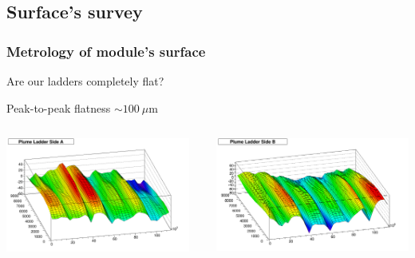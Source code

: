 \documentclass{beamer}
\begin{document}
  \subsection{Surface's survey}
  \begin{frame}
    \frametitle{Metrology of module's surface}

    \begin{block}{Are our ladders completely flat?}
     
     \begin{center}
        Peak-to-peak flatness $\sim 100~\mu$m
     \end{center}

      \vspace{-0.2cm}
      \begin{columns}[c]
        \begin{column}{5cm}
          \begin{center}
            \includegraphics[width = 0.95\textwidth]{Pictures/SideAPlumeLadder2010_M20.png}
          \end{center}
        \end{column}

        \begin{column}{5cm}
          \begin{center}
            \includegraphics[width = \textwidth]{Pictures/SideBPlumeLadder2010_M20.png}
          \end{center}
        \end{column}
      \end{columns}
      

\end{block}
\end{frame}
\end{document}
